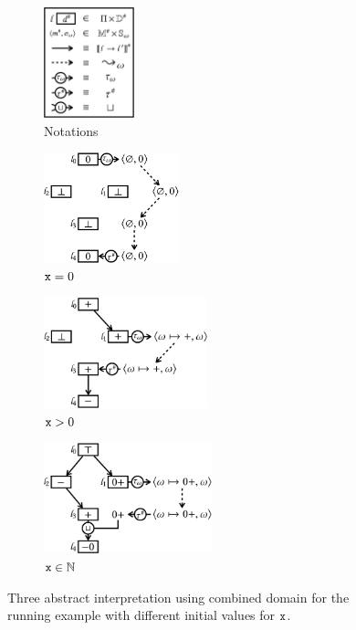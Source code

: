 \begin{figure}[t]
  \centering
  \begin{subfigure}[t]{0.15\textwidth}
    \includegraphics[height=3.2cm]{img/listing}
    \caption{Notations}
    \label{fig:ds-example1}
  \end{subfigure}
  \quad
  \begin{subfigure}[t]{0.23\textwidth}
    \includegraphics[height=3.2cm]{img/path-1}
    \caption{$\texttt{x} = 0$}
    \label{fig:ds-example2}
  \end{subfigure}
  \begin{subfigure}[t]{0.28\textwidth}
    \includegraphics[height=3.2cm]{img/path-2}
    \caption{$\texttt{x} > 0$}
    \label{fig:ds-example3}
  \end{subfigure}
  \begin{subfigure}[t]{0.28\textwidth}
    \includegraphics[height=3.2cm]{img/path-3}
    \caption{$\texttt{x} \in \mathbb{N}$}
    \label{fig:ds-example4}
  \end{subfigure}
  \caption{Three abstract interpretation using combined domain for the running
  example with different initial values for $\texttt{x}$.}
  \label{fig:ds-examples}
\end{figure}

